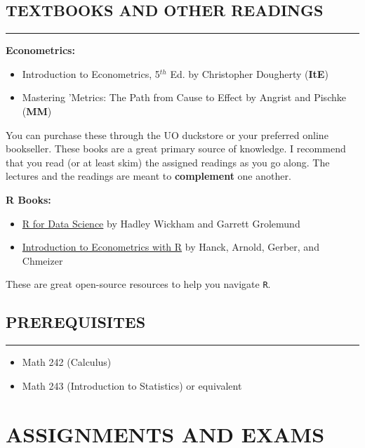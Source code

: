 \subsection*{TEXTBOOKS AND OTHER READINGS}
\vspace*{-0.5cm}
\rule{\textwidth}{2pt}
\vspace{0.1cm}

\textbf{Econometrics:}
\begin{itemize}
    \item Introduction to Econometrics, 5$^{th}$ Ed. by Christopher Dougherty (\textbf{ItE})
    \item Mastering 'Metrics: The Path from Cause to Effect by Angrist and Pischke (\textbf{MM})
\end{itemize}

You can purchase these through the UO duckstore or your preferred online bookseller. 
These books are a great primary source of knowledge. 
I recommend that you read (or at least skim) the assigned readings as you go along. 
The lectures and the readings are meant to \textbf{complement} one another. 

\vspace{0.75cm}

\textbf{R Books:}
\begin{itemize}
    \item \hyperlink{target name}{R for Data Science} by Hadley Wickham and Garrett Grolemund
    \item \hyperlink{target name}{Introduction to Econometrics with R} by Hanck, Arnold, Gerber, and Chmeizer
\end{itemize}

These are great open-source resources to help you navigate \texttt{R}.

\subsection*{PREREQUISITES}
\vspace*{-0.5cm}
\rule{\textwidth}{2pt}
\begin{itemize}
    \item Math 242 (Calculus)
    \item Math 243 (Introduction to Statistics) or equivalent
\end{itemize}

\section*{ASSIGNMENTS AND EXAMS}

